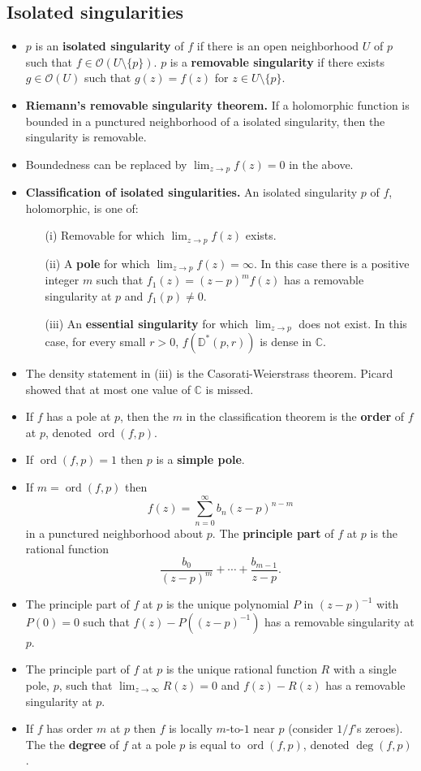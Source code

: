 \documentclass{article}
\DeclareMathOperator{\order}{ord}
\DeclareMathOperator{\degree}{deg}
\newenvironment{topic}[1]{%
{\subsection{#1}}%
\begin{itemize}%
}{%
\end{itemize}%
}
\newcommand{\theorem}[1]{\item {\bf #1.}}
\newcommand{\term}[1]{{\bf #1}}
\newcommand{\holo}[1]{\mathcal{O}(#1)}
\newcommand{\remark}{\item}
\newcommand{\pdisk}[2]{\mathbb{D}^\ast(#1, #2)}
\begin{document}
\begin{topic}{Isolated singularities}

\remark $p$ is an \term{isolated singularity} of $f$ if there is an open neighborhood $U$ of $p$ such that $f \in \holo{U \setminus \{p\}}$. $p$ is a \term{removable singularity} if there exists $g \in \holo{U}$ such that $g(z) = f(z)$ for $z \in U \setminus \{p\}$.

\theorem{Riemann's removable singularity theorem} If a holomorphic function is bounded in a punctured neighborhood of a isolated singularity, then the singularity is removable.

\remark Boundedness can be replaced by $\lim_{z \to p}f(z) = 0$ in the above.

\theorem{Classification of isolated singularities} An isolated singularity $p$ of $f$, holomorphic, is one of: \begin{itemize}
\item[(i)] Removable for which $\lim_{z \to p} f(z)$ exists.
\item[(ii)] A \term{pole} for which $\lim_{z \to p} f(z) = \infty$. In this case there is a positive integer $m$ such that $f_1(z) = (z - p)^m f(z)$ has a removable singularity at $p$ and $f_1(p) \neq 0$.
\item[(iii)] An \term{essential singularity} for which $\lim_{z \to p}$ does not exist. In this case, for every small $r > 0$, $f(\pdisk{p}{r})$ is dense in $\mathbb{C}$.
\end{itemize}

\remark The density statement in (iii) is the Casorati-Weierstrass theorem. Picard showed that at most one value of $\mathbb{C}$ is missed.

\remark If $f$ has a pole at $p$, then the $m$ in the classification theorem is the \term{order} of $f$ at $p$, denoted $\order(f, p)$.

\remark If $\order(f, p) = 1$ then $p$ is a \term{simple pole}.

\remark If $m = \order(f, p)$ then $$f(z) = \sum_{n=0}^\infty b_n (z - p)^{n - m}$$ in a punctured neighborhood about $p$. The \term{principle part} of $f$ at $p$ is the rational function $$\dfrac{b_0}{(z - p)^m} + \cdots + \dfrac{b_{m-1}}{z-p}.$$

\remark The principle part of $f$ at $p$ is the unique polynomial $P$ in $(z-p)^{-1}$ with $P(0) = 0$ such that $f(z) - P((z-p)^{-1})$ has a removable singularity at $p$.

\remark The principle part of $f$ at $p$ is the unique rational function $R$ with a single pole, $p$, such that $\lim_{z \to \infty} R(z) = 0$ and $f(z) - R(z)$ has a removable singularity at $p$.

\remark If $f$ has order $m$ at $p$ then $f$ is locally $m$-to-$1$ near $p$ (consider $1/f$'s zeroes). The the \term{degree} of $f$ at a pole $p$ is equal to $\order(f, p)$, denoted $\degree(f, p)$.

\end{topic}
\end{document}
